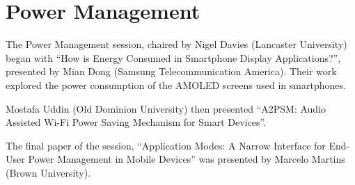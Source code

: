 \section{Power Management}
\label{sec:power}
The Power Management session, chaired by Nigel Davies (Lancaster University)
began with ``How is Energy Consumed in Smartphone Display Applications?'', 
presented by Mian Dong (Samsung Telecommunication America). Their work explored
the power consumption of the AMOLED screens used in smartphones.

Mostafa Uddin (Old Dominion University) then presented ``A2PSM: Audio Assisted 
Wi-Fi Power Saving Mechanism for Smart Devices''.

The final paper of the session, ``Application Modes: A Narrow Interface for End-
User Power Management in Mobile Devices'' was presented by Marcelo Martins (Brown 
University).